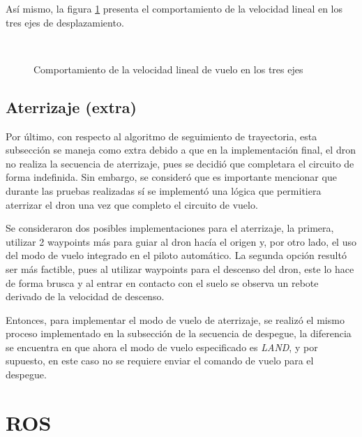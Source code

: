  Así mismo, la figura \ref{fig:pymav_missionv} presenta el comportamiento de la velocidad lineal en los tres ejes de desplazamiento.

\begin{figure}[ht]
    \centering
    \hfill
    \\
    \hfill

    \caption{Comportamiento de la velocidad lineal de vuelo en los tres ejes}
    \label{fig:pymav_missionv}
\end{figure}


\subsection{Aterrizaje (extra)}

Por último, con respecto al algoritmo de seguimiento de trayectoria, esta subsección se maneja como extra debido a que en la implementación final, el dron no realiza la secuencia de aterrizaje, pues se decidió que completara el circuito de forma indefinida. Sin embargo, se consideró que es importante mencionar que durante las pruebas realizadas sí se implementó una lógica que permitiera aterrizar el dron una vez que completo el circuito de vuelo. 

Se consideraron dos posibles implementaciones para el aterrizaje, la primera, utilizar 2 waypoints más para guiar al dron hacía el origen y, por otro lado, el uso del modo de vuelo integrado en el piloto automático. La segunda opción resultó ser más factible, pues al utilizar waypoints para el descenso del dron, este lo hace de forma brusca y al entrar en contacto con el suelo se observa un rebote derivado de la velocidad de descenso.

Entonces, para implementar el modo de vuelo de aterrizaje, se realizó el mismo proceso implementado en la subsección de la secuencia de despegue, la diferencia se encuentra en que ahora el modo de vuelo especificado es \textit{LAND}, y por supuesto, en este caso no se requiere enviar el comando de vuelo para el despegue.


\section{ROS}

